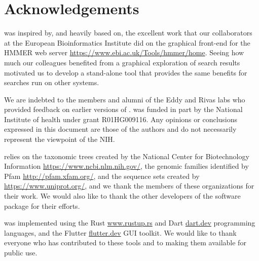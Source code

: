 \chapter{Acknowledgements}

\homot was inspired by, and heavily based on, the excellent work that our collaborators at the European Bioinformatics Institute did on the graphical front-end for the HMMER web server \url{https://www.ebi.ac.uk/Tools/hmmer/home}.  Seeing how much our colleagues benefited from a graphical exploration of search results motivated us to develop a stand-alone tool that provides the same benefits for searches run on other systems.

We are indebted to the members and alumni of the Eddy and Rivas labs who provided feedback on earlier versions of \homot.  \homot was funded in part by the National Institute of health under grant R01HG009116.  Any opinions or conclusions expressed in this document are those of the authors and do not necessarily represent the viewpoint of the {NIH}.

\homot relies on the taxonomic trees created by the National Center for Biotechnology Information \url{https://www.ncbi.nlm.nih.gov/}, the genomic families identified by Pfam \url{http://pfam.xfam.org/}, and the sequence sets created by \uniprot \url{https://www.uniprot.org/}, and we thank the members of these organizations for their work.  We would also like to thank the other developers of the \hmmer software package for their efforts.

\homot was implemented using the Rust \url{www.rustup.rs} and Dart \url{dart.dev} programming languages,  and the Flutter \url{flutter.dev} GUI toolkit. We would like to thank everyone who has contributed to these tools and to making them available for public use.

